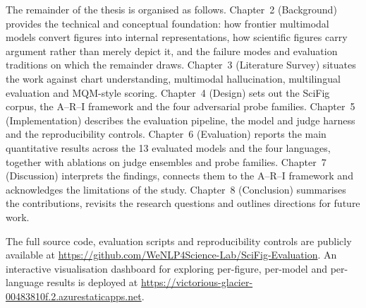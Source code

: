 The remainder of the thesis is organised as follows.
Chapter~2 (Background) provides the technical and conceptual
foundation: how frontier multimodal models convert figures into
internal representations, how scientific figures carry argument
rather than merely depict it, and the failure modes and evaluation
traditions on which the remainder draws.
Chapter~3 (Literature Survey) situates the work against chart
understanding, multimodal hallucination, multilingual evaluation
and MQM-style scoring.
Chapter~4 (Design) sets out the SciFig corpus, the A--R--I
framework and the four adversarial probe families.
Chapter~5 (Implementation) describes the evaluation pipeline, the
model and judge harness and the reproducibility controls.
Chapter~6 (Evaluation) reports the main quantitative results
across the 13 evaluated models and the four languages, together
with ablations on judge ensembles and probe families.
Chapter~7 (Discussion) interprets the findings, connects them to
the A--R--I framework and acknowledges the limitations of the
study.
Chapter~8 (Conclusion) summarises the contributions, revisits the
research questions and outlines directions for future work.

The full source code, evaluation scripts and reproducibility controls are publicly available at \url{https://github.com/WeNLP4Science-Lab/SciFig-Evaluation}.
An interactive visualisation dashboard for exploring per-figure, per-model and per-language results is deployed at \url{https://victorious-glacier-00483810f.2.azurestaticapps.net}.
